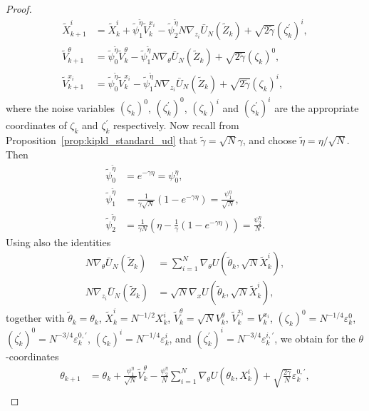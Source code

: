 \begin{proof}
\begin{align*}
\widetilde{X}_{k+1}^i &= \widetilde{X}_k^i + \tilde{\psi}_1^{\tilde{\eta}} \widetilde{V}_k^{x_i} - \tilde{\psi}_2^{\tilde{\eta}} N \nabla_{z_i} \bar U_N(\widetilde{Z}_k) + \sqrt{2\tilde{\gamma}}(\zeta_{k}^\prime)^i,\\
\widetilde{V}_{k+1}^\theta &= \tilde{\psi}_0^{\tilde{\eta}} \widetilde{V}_k^\theta - \tilde{\psi}_1^{\tilde{\eta}} N \nabla_\theta \bar U_N(\widetilde{Z}_k) + \sqrt{2\tilde{\gamma}}(\zeta_{k})^0,\\
\widetilde{V}_{k+1}^{x_i} &= \tilde{\psi}_0^{\tilde{\eta}} \widetilde{V}_k^{x_i} - \tilde{\psi}_1^{\tilde{\eta}} N \nabla_{z_i} \bar U_N(\widetilde{Z}_k) + \sqrt{2\tilde{\gamma}}(\zeta_{k})^i,
\end{align*}
\normalsize
where the noise variables $(\zeta_k)^0$, $(\zeta_k^\prime)^0$, $(\zeta_k)^i$ and $(\zeta_k^\prime)^i$ are the appropriate coordinates of $\zeta_k$ and $\zeta_k^\prime$ respectively. Now recall from Proposition~\ref{prop:kipld_standard_ud} that $\tilde{\gamma} = \sqrt{N}\gamma$, and choose $\tilde{\eta}=\eta/\sqrt{N}$. Then
\begin{align*}
\tilde{\psi}_0^{\tilde{\eta}} &= e^{-\gamma\eta} = \psi_0^\eta,\\
\tilde{\psi}_1^{\tilde{\eta}} &= \frac{1}{\gamma\sqrt{N}} (1-e^{-\gamma\eta}) = \frac{\psi_1^\eta}{\sqrt{N}},\\
\tilde{\psi}_2^{\tilde{\eta}} &= \frac{1}{\gamma N}(\eta - \frac{1}{\gamma}(1-e^{-\gamma\eta})) = \frac{\psi_2^\eta}{N}.
\end{align*}
Using also the identities
\begin{equation}
\begin{aligned}
N\nabla_\theta \bar U_N(\widetilde{Z}_k) &= \sum_{i=1}^N \nabla_\theta U(\widetilde{\theta}_k,\sqrt{N}\widetilde{X}_k^i),\\
N\nabla_{z_i} \bar U_N(\widetilde{Z}_k) &= \sqrt{N}\nabla_x U(\widetilde{\theta}_k,\sqrt{N}\widetilde{X}_k^i),
\end{aligned}\label{eq:grad_rescaling}
\end{equation}
together with $\widetilde{\theta}_k=\theta_k$, $\widetilde{X}_k^i=N^{-1/2}X_k^i$, $\widetilde{V}_k^\theta=\sqrt{N}V_k^\theta$, $\widetilde{V}_k^{x_i}=V_k^{x_i}$, $(\zeta_k)^0=N^{-1/4}\varepsilon_k^0$, $(\zeta_k^\prime)^0=N^{-3/4}\varepsilon_k^{0,\prime}$, $(\zeta_k)^i=N^{-1/4}\varepsilon_k^i$, and $(\zeta_k^\prime)^i=N^{-3/4}\varepsilon_k^{i,\prime}$, we obtain for the $\theta$-coordinates
\small
\begin{align*}
\theta_{k+1} &= \theta_k + \frac{\psi_1^\eta}{\sqrt{N}}\widetilde{V}^\theta_k - \frac{\psi_2^\eta}{N} \sum_{i=1}^N \nabla_\theta U(\theta_k, X_k^i)+ \sqrt{\frac{2\gamma}{N}} \varepsilon^{0,\prime}_{k},\\

\end{align*}
\end{proof}
